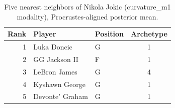 \begin{table}[htbp]
  \centering\small
  \begin{tabular}{rllc}
    \toprule
    Rank & Player & Position & Archetype \\
    \midrule
    1 & Luka Doncic & G & 1 \\
    2 & GG Jackson II & F & 1 \\
    3 & LeBron James & G & 4 \\
    4 & Kyshawn George & G & 1 \\
    5 & Devonte' Graham & G & 1 \\
    \bottomrule
  \end{tabular}
  \caption{Five nearest neighbors of Nikola Jokic (curvature_m1 modality), Procrustes-aligned posterior mean.}
  \label{tab:Nikola_Jokic_neighbors_curvature_m1}
\end{table}

